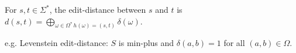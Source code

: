 \documentclass[runningheads]{llncs}
\begin{document}
\noindent
\begin{definition}
For  $s, t \in \Sigma^*$, the edit-distance between $s$ and $t$ is  
\( 
d(s, t) = \displaystyle\bigoplus_{\omega \in \Omega^*\, h(\omega) = (s, t)} \delta(\omega)
\).
\end{definition}

e.g. Levenstein edit-distance: $S$ is min-plus and $\delta(a, b) = 1$ for all $(a, b) \in \Omega$.


\end{document}
